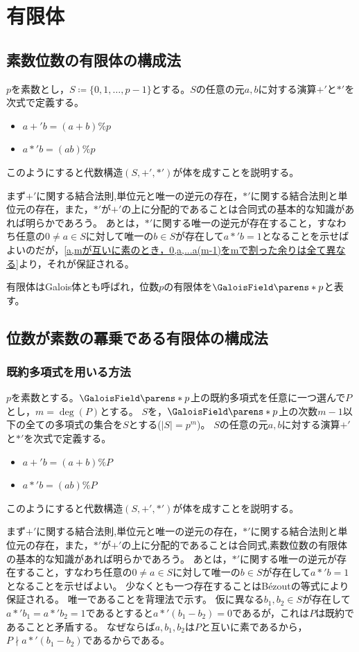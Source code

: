 \chapter{有限体}
    \section{素数位数の有限体の構成法}
        $p$を素数とし，$S\coloneq\{0,1,\dotsc,p-1\}$とする。$S$の任意の元$a,b$に対する演算$+'$と$*'$を次式で定義する。
        \begin{itemize}
            \item $a+'b = (a+b)\% p$
            \item $a*'b = (ab)\% p$
        \end{itemize}
        このようにすると代数構造$(S,+',*')$が体を成すことを説明する。
        \par
        まず$+'$に関する結合法則,単位元と唯一の逆元の存在，$*'$に関する結合法則と単位元の存在，また，$*'$が$+'$の上に分配的であることは合同式の基本的な知識があれば明らかであろう。
        あとは，$*'$に関する唯一の逆元が存在すること，すなわち任意の$0 \neq a\in S$に対して唯一の$b\in S$が存在して$a*'b=1$となることを示せばよいのだが，\ref{a,mが互いに素のとき，0,a,...a(m-1)をmで割った余りは全て異なる}より，それが保証される。
        \par
        有限体はGalois体とも呼ばれ，位数$p$の有限体を$\GaloisField\parens*{p}$と表す。
    \section{位数が素数の冪乗である有限体の構成法}
        \subsection{既約多項式を用いる方法}
            $p$を素数とする。$\GaloisField\parens*{p}$上の既約多項式を任意に一つ選んで$P$とし，$m = \deg(P)$とする。
            $S$を，$\GaloisField\parens*{p}$上の次数$m-1$以下の全ての多項式の集合を$S$とする($|S|=p^m$)。
            $S$の任意の元$a,b$に対する演算$+'$と$*'$を次式で定義する。
            \begin{itemize}
                \item $a+'b = (a+b)\% P$
                \item $a*'b = (ab)\% P$
            \end{itemize}
            このようにすると代数構造$(S,+',*')$が体を成すことを説明する。
            \par
            まず$+'$に関する結合法則,単位元と唯一の逆元の存在，$*'$に関する結合法則と単位元の存在，また，$*'$が$+'$の上に分配的であることは合同式,素数位数の有限体の基本的な知識があれば明らかであろう。
            あとは，$*'$に関する唯一の逆元が存在すること，すなわち任意の$0 \neq a\in S$に対して唯一の$b\in S$が存在して$a*'b=1$となることを示せばよい。
            少なくとも一つ存在することはB\'ezoutの等式により保証される。
            唯一であることを背理法で示す。
            仮に異なる$b_1,b_2 \in S$が存在して$a*'b_1 = a*'b_2 = 1$であるとすると$a*'(b_1 - b_2) = 0$であるが，これは$P$は既約であることと矛盾する。
            なぜならば$a,b_1,b_2$は$P$と互いに素であるから，$P \nmid a*'(b_1 - b_2)$であるからである。
